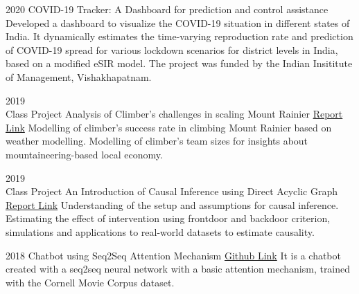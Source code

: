 \documentclass[10pt]{developercv} %
\begin{document}
\begin{entrylist}
    \vspace*{-5pt}
    \entry
    {2020}
    {COVID-19 Tracker: A Dashboard for prediction and control assistance}
    {}
    {\small Developed a dashboard to visualize the COVID-19 situation in different states of India. It dynamically estimates the time-varying reproduction rate and prediction of COVID-19 spread for various lockdown scenarios for district levels in India, based on a modified eSIR model. The project was funded by the Indian Insititute of Management, Vishakhapatnam.}

    \vspace*{-5pt}
    \entry
    {2019\\Class Project}
    {Analysis of Climber's challenges in scaling Mount Rainier}
    {\href{https://github.com/subroy13/mount-rainier-case-study}{Report Link} }
    {\small Modelling of climber's success rate in climbing Mount Rainier based on weather modelling. Modelling of climber's team sizes for insights about mountaineering-based local economy.}

    \vspace*{-5pt}
    \entry
    {2019\\Class Project}
    {An Introduction of Causal Inference using Direct Acyclic Graph}
    {\href{https://www.statwizard.in/aboutme/causal-dag/final-report.pdf}{Report Link} }
    {\small Understanding of the setup and assumptions for causal inference. Estimating the effect of intervention using frontdoor and backdoor criterion, simulations and applications to real-world datasets to estimate causality.}

    \vspace*{-5pt}
    \entry
    {2018}
    {Chatbot using Seq2Seq Attention Mechanism}
    {\href{https://github.com/subroy13/seq2seq-attention-bot}{Github Link}}
    {\small It is a chatbot created with a seq2seq neural network with a basic attention mechanism, trained with the Cornell Movie Corpus dataset.}
\end{entrylist}
\end{document}
